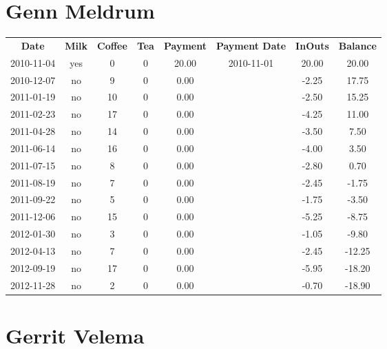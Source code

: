 \section{Genn Meldrum}

\begin{center}
\begin{tabular}{cccccccc}
\textbf{Date} & \textbf{Milk} & \textbf{Coffee} & \textbf{Tea} & \textbf{Payment} & \textbf{Payment Date} & \textbf{InOuts} & \textbf{Balance} \\
2010-11-04 & yes &  0 & 0 & 20.00 & 2010-11-01 & 20.00 &  20.00\\ 
2010-12-07 & no &  9 & 0 &  0.00 &  & -2.25 &  17.75\\ 
2011-01-19 & no & 10 & 0 &  0.00 &  & -2.50 &  15.25\\ 
2011-02-23 & no & 17 & 0 &  0.00 &  & -4.25 &  11.00\\ 
2011-04-28 & no & 14 & 0 &  0.00 &  & -3.50 &   7.50\\ 
2011-06-14 & no & 16 & 0 &  0.00 &  & -4.00 &   3.50\\ 
2011-07-15 & no &  8 & 0 &  0.00 &  & -2.80 &   0.70\\ 
2011-08-19 & no &  7 & 0 &  0.00 &  & -2.45 &  -1.75\\ 
2011-09-22 & no &  5 & 0 &  0.00 &  & -1.75 &  -3.50\\ 
2011-12-06 & no & 15 & 0 &  0.00 &  & -5.25 &  -8.75\\ 
2012-01-30 & no &  3 & 0 &  0.00 &  & -1.05 &  -9.80\\ 
2012-04-13 & no &  7 & 0 &  0.00 &  & -2.45 & -12.25\\ 
2012-09-19 & no & 17 & 0 &  0.00 &  & -5.95 & -18.20\\ 
2012-11-28 & no &  2 & 0 &  0.00 &  & -0.70 & -18.90
\end{tabular}
\end{center}

\section{Gerrit Velema}

